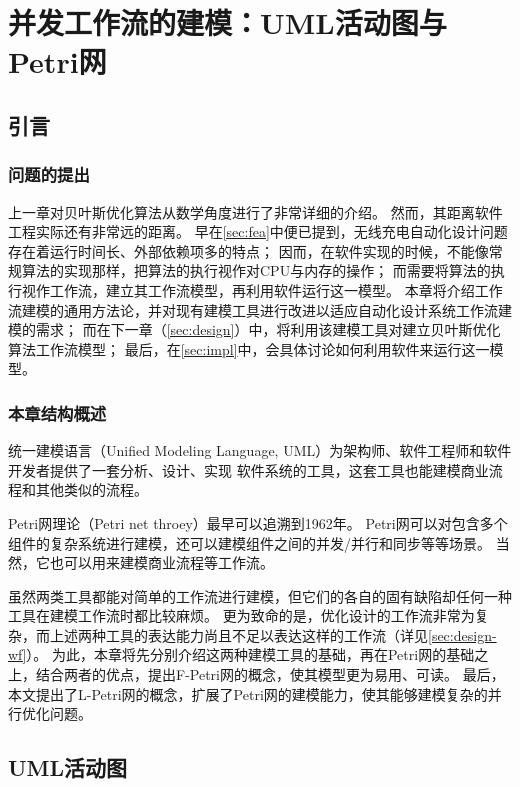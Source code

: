 \documentclass[index]{subfiles}
\begin{document}
\chapter{并发工作流的建模：UML活动图与Petri网}\label{sec:petri}
\section{引言}\label{sec:petri-intro}
\subsection{问题的提出}
上一章对贝叶斯优化算法从数学角度进行了非常详细的介绍。
然而，其距离软件工程实际还有非常远的距离。
早在\cref{sec:fea}中便已提到，无线充电自动化设计问题存在着运行时间长、外部依赖项多的特点；
因而，在软件实现的时候，不能像常规算法的实现那样，把算法的执行视作对CPU与内存的操作；
而需要将算法的执行视作工作流，建立其工作流模型，再利用软件运行这一模型。
本章将介绍工作流建模的通用方法论，并对现有建模工具进行改进以适应自动化设计系统工作流建模的需求；
而在下一章（\cref{sec:design}）中，将利用该建模工具对建立贝叶斯优化算法工作流模型；
最后，在\cref{sec:impl}中，会具体讨论如何利用软件来运行这一模型。

\subsection{本章结构概述}
统一建模语言（Unified Modeling Language, UML）为架构师、软件工程师和软件开发者提供了一套分析、设计、实现
软件系统的工具，这套工具也能建模商业流程和其他类似的流程\cite{omg}。

Petri网理论（Petri net throey）最早可以追溯到1962年\cite{petri1962}。
Petri网可以对包含多个组件的复杂系统进行建模，还可以建模组件之间的并发/并行和同步等等场景\cite{peterson1981}。
当然，它也可以用来建模商业流程等工作流\cite{ellis1993}。

虽然两类工具都能对简单的工作流进行建模，但它们的各自的固有缺陷却任何一种工具在建模工作流时都比较麻烦。
更为致命的是，优化设计的工作流非常为复杂，而上述两种工具的表达能力尚且不足以表达这样的工作流（详见\cref{sec:design-wf}）。
为此，本章将先分别介绍这两种建模工具的基础，再在Petri网的基础之上，结合两者的优点，提出F-Petri网的概念，使其模型更为易用、可读。
最后，本文提出了L-Petri网的概念，扩展了Petri网的建模能力，使其能够建模复杂的并行优化问题。

\section{UML活动图}
\end{document}
